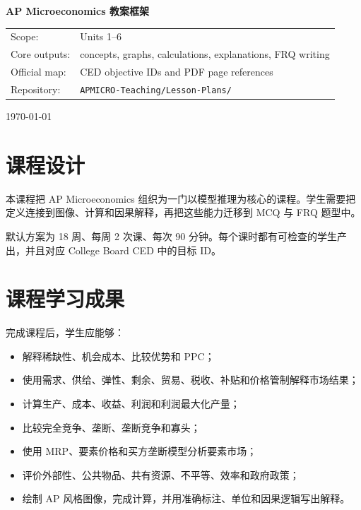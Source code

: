 \documentclass[11pt,a4paper]{ctexart}
\newcommand{\codepath}[1]{\texttt{\small #1}}
\begin{document}
\begin{titlepage}\centering\vspace*{2cm}
{\Huge\bfseries AP Microeconomics 教案框架\par}\vspace{0.5cm}{\LARGE 36 课时课程框架与课时设计\par}
\vspace{1cm}{\large 18 weeks \textperiodcentered 2 meetings per week \textperiodcentered 90 minutes per meeting\par}
\vspace{0.5cm}{\large 中文版（保留 AP 专业术语与英文缩写）\par}\vfill
\begin{tabular}{ll}Scope: & Units 1--6\\Core outputs: & concepts, graphs, calculations, explanations, FRQ writing\\Official map: & CED objective IDs and PDF page references\\Repository: & \codepath{APMICRO-Teaching/Lesson-Plans/}\\\end{tabular}
\vfill{\large \today\par}\end{titlepage}
\tableofcontents\newpage
\section{课程设计}
本课程把 AP Microeconomics 组织为一门以模型推理为核心的课程。学生需要把定义连接到图像、计算和因果解释，再把这些能力迁移到 MCQ 与 FRQ 题型中。

默认方案为 18 周、每周 2 次课、每次 90 分钟。每个课时都有可检查的学生产出，并且对应 College Board CED 中的目标 ID。

\section{课程学习成果}
完成课程后，学生应能够：
\begin{itemize}[leftmargin=2em]
\item 解释稀缺性、机会成本、比较优势和 PPC；
\item 使用需求、供给、弹性、剩余、贸易、税收、补贴和价格管制解释市场结果；
\item 计算生产、成本、收益、利润和利润最大化产量；
\item 比较完全竞争、垄断、垄断竞争和寡头；
\item 使用 MRP、要素价格和买方垄断模型分析要素市场；
\item 评价外部性、公共物品、共有资源、不平等、效率和政府政策；
\item 绘制 AP 风格图像，完成计算，并用准确标注、单位和因果逻辑写出解释。
\end{itemize}
\end{document}
